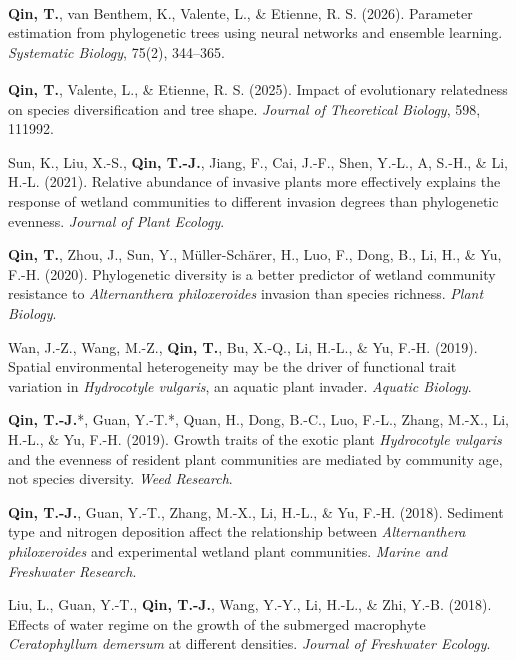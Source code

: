 \documentclass[10pt,a4paper]{article}
\begin{document}
\begin{publist}
  \item \textbf{Qin, T.}, van Benthem, K., Valente, L.\textsuperscript{\dag},
  \& Etienne, R. S.\textsuperscript{\dag} (2026).
  Parameter estimation from phylogenetic trees using neural networks and ensemble learning.
  \emph{Systematic Biology}, 75(2), 344--365.

  \item \textbf{Qin, T.}, Valente, L.\textsuperscript{\dag},
  \& Etienne, R. S.\textsuperscript{\dag} (2025).
  Impact of evolutionary relatedness on species diversification and tree shape.
  \emph{Journal of Theoretical Biology}, 598, 111992.

  \item Sun, K., Liu, X.-S., \textbf{Qin, T.-J.}, Jiang, F., Cai, J.-F.,
  Shen, Y.-L., A, S.-H., \& Li, H.-L. (2021).
  Relative abundance of invasive plants more effectively explains the response of wetland
  communities to different invasion degrees than phylogenetic evenness.
  \emph{Journal of Plant Ecology}.

  \item \textbf{Qin, T.}, Zhou, J., Sun, Y., M\"uller-Sch\"arer, H., Luo, F.,
  Dong, B., Li, H., \& Yu, F.-H. (2020).
  Phylogenetic diversity is a better predictor of wetland community resistance to
  \emph{Alternanthera philoxeroides} invasion than species richness.
  \emph{Plant Biology}.

  \item Wan, J.-Z., Wang, M.-Z., \textbf{Qin, T.}, Bu, X.-Q., Li, H.-L.,
  \& Yu, F.-H. (2019).
  Spatial environmental heterogeneity may be the driver of functional trait variation in
  \emph{Hydrocotyle vulgaris}, an aquatic plant invader.
  \emph{Aquatic Biology}.

  \item \textbf{Qin, T.-J.}*, Guan, Y.-T.*, Quan, H., Dong, B.-C., Luo, F.-L.,
  Zhang, M.-X., Li, H.-L., \& Yu, F.-H. (2019).
  Growth traits of the exotic plant \emph{Hydrocotyle vulgaris} and the evenness of resident
  plant communities are mediated by community age, not species diversity.
  \emph{Weed Research}.

  \item \textbf{Qin, T.-J.}, Guan, Y.-T., Zhang, M.-X., Li, H.-L.,
  \& Yu, F.-H. (2018).
  Sediment type and nitrogen deposition affect the relationship between
  \emph{Alternanthera philoxeroides} and experimental wetland plant communities.
  \emph{Marine and Freshwater Research}.

  \item Liu, L., Guan, Y.-T., \textbf{Qin, T.-J.}, Wang, Y.-Y., Li, H.-L.,
  \& Zhi, Y.-B. (2018).
  Effects of water regime on the growth of the submerged macrophyte
  \emph{Ceratophyllum demersum} at different densities.
  \emph{Journal of Freshwater Ecology}.
\end{publist}
\end{document}
